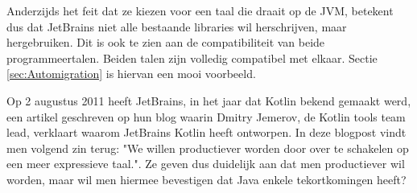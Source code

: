 Anderzijds het feit dat ze kiezen voor een taal die draait op de JVM, betekent dus dat JetBrains niet alle bestaande libraries wil herschrijven, maar hergebruiken. Dit is ook te zien aan de compatibiliteit van beide programmeertalen. Beiden talen zijn volledig compatibel met elkaar. Sectie \ref{sec:Automigration} is hiervan een mooi voorbeeld.

Op 2 augustus 2011 heeft JetBrains, in het jaar dat Kotlin bekend gemaakt werd, een artikel geschreven op hun blog \textcite{JetBrainsNeedKotlin} waarin Dmitry Jemerov, de Kotlin tools team lead, verklaart waarom JetBrains Kotlin heeft ontworpen. In deze blogpost vindt men volgend zin terug: "We willen productiever worden door over te schakelen op een meer expressieve taal.". Ze geven dus duidelijk aan dat men productiever wil worden, maar wil men hiermee bevestigen dat Java enkele tekortkomingen heeft?




